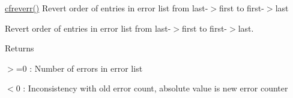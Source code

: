 \hyperlink{group__errors_gabc3a143038fbcabc944d224e20ca50f8}{cfreverr()} Revert order of entries in error list from last-\/$>$first to first-\/$>$last 

Revert order of entries in error list from last-\/$>$first to first-\/$>$last.

\begin{DoxyReturn}{Returns}
\begin{DoxyItemize}
\item {\ttfamily $>$=0} \-: Number of errors in error list \item {\ttfamily $<$0} \-: Inconsistency with old error count, absolute value is new error counter \end{DoxyItemize}

\end{DoxyReturn}
